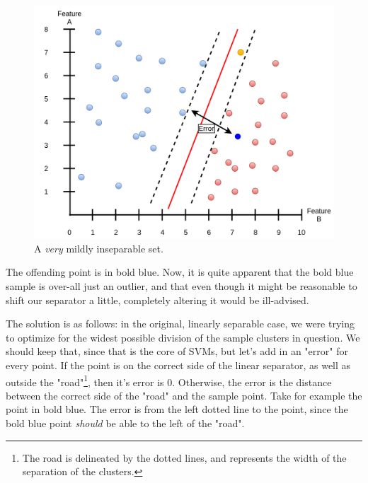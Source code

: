 \documentclass[a4paper, 12pt]{article}
\begin{document}
                        \begin{figure}[h]
                            \caption{A \textit{very} mildly inseparable set.}
                            \centering
                            \includegraphics[width=\textwidth]{mildlyInseparable}
                        \end{figure} 
                        
                        \par The offending point is in bold blue. Now, it is quite apparent that the bold blue sample is over-all just an outlier, and that even though it might be reasonable to shift our separator a little, completely altering it would be ill-advised.
                        
                        \par The solution is as follows: in the original, linearly separable case, we were trying to optimize for the widest possible division of the sample clusters in question. We should keep that, since that is the core of SVMs, but let's add in an "error" for every point. If the point is on the correct side of the linear separator, as well as outside the "road"\footnote{The road is delineated by the dotted lines, and represents the width of the separation of the clusters.}, then it's error is 0. Otherwise, the error is the distance between the correct side of the "road" and the sample point. Take for example the point in bold blue. The error is from the left dotted line to the point, since the bold blue point \textit{should} be able to the left of the "road".
                        
\end{document}
